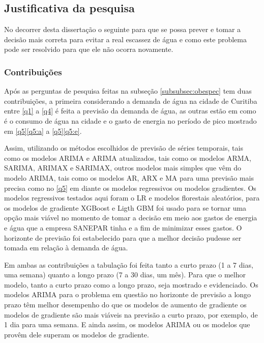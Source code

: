 \subsection{Justificativa da pesquisa} \label{subsec:justif}

No decorrer desta dissertação o seguinte para que se possa prever e tomar a decisão mais correta para evitar a real escassez de água e como este problema pode ser resolvido para que ele não ocorra novamente.

\subsubsection{Contribui\c c\~oes} \label{subsubsec:Contribuição}

Após as perguntas de pesquisa feitas na subseção \ref{subsubsec:obespec} tem duas contribuições, a primeira considerando a demanda de água na cidade de Curitiba entre \ref{q1} a \ref{q4} é feita a previsão da demanda de água, as outras estão em como é o consumo de água na cidade e o gasto de energia no período de pico mostrado em \ref{q5}\ref{q5:a} a \ref{q5}\ref{q5:e}.


Assim, utilizando os métodos escolhidos de previsão de séries temporais, tais como os modelos ARIMA e ARIMA atualizados, tais como os modelos ARMA, SARIMA, ARIMAX e SARIMAX, outros modelos mais simples que vêm do modelo ARIMA, tais como os modelos AR, ARX e MA para uma previsão mais precisa como no \ref{q5} em diante os modelos regressivos ou modelos gradientes. Os modelos regressivos testados aqui foram o LR e modelos florestais aleatórios, para os modelos de gradiente XGBoost e Ligth GBM foi usado para se tornar uma opção mais viável no momento de tomar a decisão em meio aos gastos de energia e água que a empresa SANEPAR tinha e a fim de minimizar esses gastos. O horizonte de previsão foi estabelecido para que a melhor decisão pudesse ser tomada em relação à demanda de água.

Em ambas as contribuições a tabulação foi feita tanto a curto prazo (1 a 7 dias, uma semana) quanto a longo prazo (7 a 30 dias, um mês). Para que o melhor modelo, tanto a curto prazo como a longo prazo, seja mostrado e evidenciado. Os modelos ARIMA para o problema em questão no horizonte de previsão a longo prazo têm melhor desempenho do que os modelos de aumento de gradiente os modelos de gradiente são mais viáveis na previsão a curto prazo, por exemplo, de 1 dia para uma semana. E ainda assim, os modelos ARIMA ou os modelos que provêm dele superam os modelos de gradiente.

